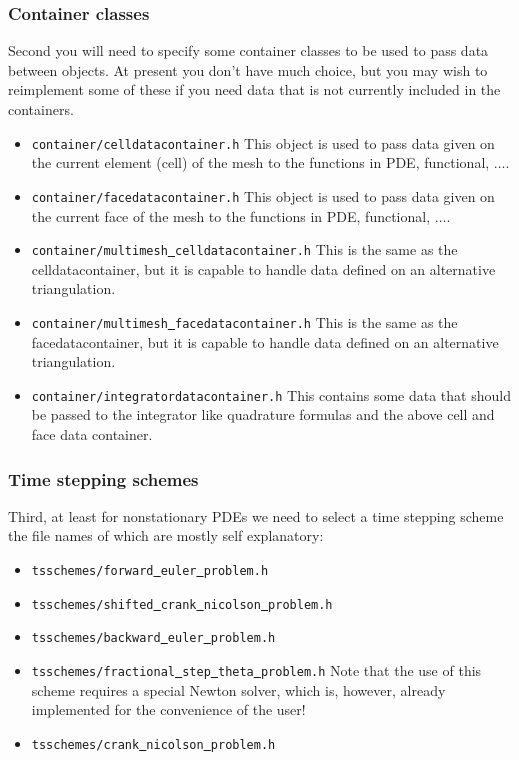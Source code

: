 \subsubsection{Container classes}
Second you will need to specify some container classes to be used to 
pass data between objects. At present you don't have much choice, but you may wish 
to reimplement some of these if you need data that is not currently included in 
the containers.
\begin{itemize}
\item \texttt{container/celldatacontainer.h} This object is used to pass data 
  given on the current element (cell) of the mesh to the functions in PDE, functional, 
  $\ldots$. 
\item \texttt{container/facedatacontainer.h} This object is used to pass data 
  given on the current face of the mesh to the functions in PDE, functional, 
  $\ldots$. 
\item \texttt{container/multimesh\underline{ }celldatacontainer.h} This is the same as the 
  celldatacontainer, but it
  is capable to handle data defined on an alternative triangulation.
\item \texttt{container/multimesh\underline{ }facedatacontainer.h} This is the same as the
  facedatacontainer, but it
  is capable to handle data defined on an alternative triangulation.
\item \texttt{container/integratordatacontainer.h} This contains some data that 
  should be passed to the integrator like quadrature formulas and the above cell and 
  face data container.
\end{itemize}

\subsubsection{Time stepping schemes}
Third, at least for nonstationary PDEs we need to select a time stepping scheme
the file names of which are mostly self explanatory:
\begin{itemize}
\item \texttt{tsschemes/forward\underline{ }euler\underline{ }problem.h}
\item \texttt{tsschemes/shifted\underline{ }crank\underline{ }nicolson\underline{ }problem.h}
\item \texttt{tsschemes/backward\underline{ }euler\underline{ }problem.h}
\item \texttt{tsschemes/fractional\underline{ }step\underline{ }theta\underline{ }problem.h} Note that the use of this scheme requires a special Newton solver, which is, however, already
implemented for the convenience of the user!
\item \texttt{tsschemes/crank\underline{ }nicolson\underline{ }problem.h}
\end{itemize}


